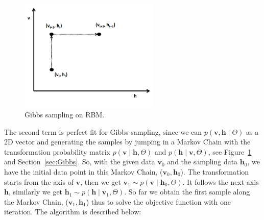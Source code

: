 \begin{figure}[hbt]
	\centering
	\includegraphics[width=0.6\textwidth]{pics_sdbn/gibbs.png}
	\caption{Gibbs sampling on RBM.}
	\label{fig:gibbs}
\end{figure}
The second term is perfect fit for Gibbs sampling, since we can $ p(\mathbf{v}, \mathbf{h} \mid \Theta) $ as a 2D vector and generating the samples by jumping in a Markov Chain with the transformation probability matrix $ p(\mathbf{v} \mid \mathbf{h}, \Theta) $ and $ p(\mathbf{h} \mid \mathbf{v}, \Theta) $, see Figure~\ref{fig:gibbs} and Section~\ref{sec:Gibbs}.
So, with the given data $ \mathbf{v}_0 $ and the sampling data $ \mathbf{h}_0 $, we have the initial data point in this Markov Chain,  ($ \mathbf{v}_0, \mathbf{h}_0$).
The transformation starts from the axis of $ \mathbf{v} $, then we get $ \mathbf{v}_1 \sim p( \mathbf{v} \mid \mathbf{h}_0, \Theta) $.
It follows the next axis $ \mathbf{h} $, similarly we get $ \mathbf{h}_1 \sim p( \mathbf{h} \mid \mathbf{v}_1, \Theta) $.
So far we obtain the first sample along the Markov Chain, ($ \mathbf{v}_1, \mathbf{h}_1$) thus to solve the objective function with one iteration.
The algorithm is described below:   
